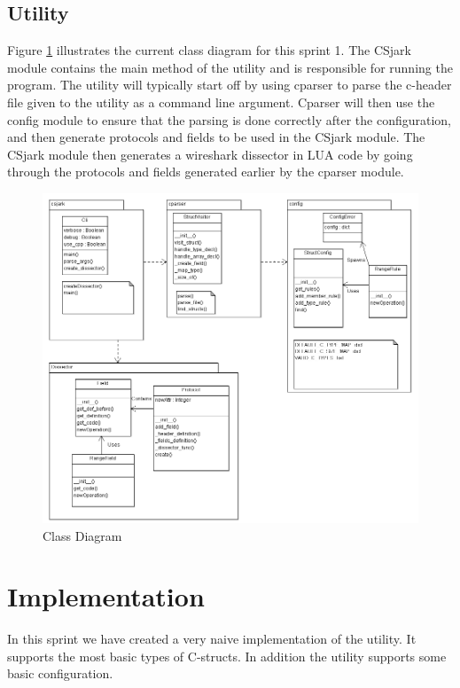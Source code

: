 \subsection{Utility}
Figure \ref{fig:sp1_class} illustrates the current class diagram for this sprint 1. The CSjark module contains the main method of the utility and is responsible for running the program. The utility will typically start off by using cparser to parse the c-header file given to the utility as a command line argument. Cparser will then use the config module to ensure that the parsing is done correctly after the configuration, and then generate protocols and fields to be used in the CSjark module. The CSjark module then generates a wireshark dissector in LUA code by going through the protocols and fields generated earlier by the cparser module. 

\begin{figure}[!ht]
\includegraphics[width=\textwidth]{./sprints/img/class_diagram_s1.png}
\caption{Class Diagram}
\label{fig:sp1_class}
\end{figure}

\section{Implementation}

In this sprint we have created a very naive implementation of the utility. It supports the most basic types of C-structs. In addition the utility supports some basic configuration.

